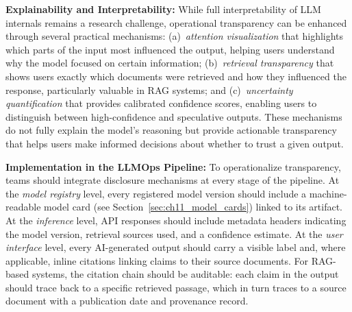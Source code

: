 \textbf{Explainability and Interpretability:} While full interpretability of LLM internals remains a research challenge, operational transparency can be enhanced through several practical mechanisms: (a)~\emph{attention visualization} that highlights which parts of the input most influenced the output, helping users understand why the model focused on certain information; (b)~\emph{retrieval transparency} that shows users exactly which documents were retrieved and how they influenced the response, particularly valuable in RAG systems; and (c)~\emph{uncertainty quantification} that provides calibrated confidence scores, enabling users to distinguish between high-confidence and speculative outputs. These mechanisms do not fully explain the model's reasoning but provide actionable transparency that helps users make informed decisions about whether to trust a given output.

\textbf{Implementation in the LLMOps Pipeline:} To operationalize transparency, teams should integrate disclosure mechanisms at every stage of the pipeline. At the \emph{model registry} level, every registered model version should include a machine-readable model card (see Section~\ref{sec:ch11_model_cards}) linked to its artifact. At the \emph{inference} level, API responses should include metadata headers indicating the model version, retrieval sources used, and a confidence estimate. At the \emph{user interface} level, every AI-generated output should carry a visible label and, where applicable, inline citations linking claims to their source documents. For RAG-based systems, the citation chain should be auditable: each claim in the output should trace back to a specific retrieved passage, which in turn traces to a source document with a publication date and provenance record.


